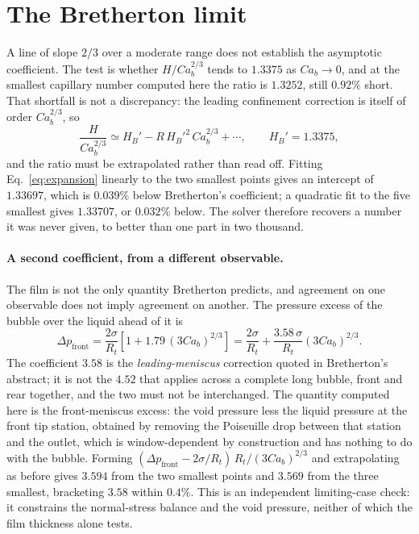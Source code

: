 \documentclass[11pt,a4paper]{article}
\begin{document}
\section{The Bretherton limit}
\label{sec:limit}

A line of slope $2/3$ over a moderate range does not establish the asymptotic
coefficient. The test is whether $H/Ca_b^{2/3}$ tends to $1.3375$ as
$Ca_b\to0$, and at the smallest capillary number computed here the ratio is
$1.3252$, still $0.92\%$ short. That shortfall is not a discrepancy: the
leading confinement correction is itself of order $Ca_b^{2/3}$, so
\begin{equation}
  \frac{H}{Ca_b^{2/3}}\simeq H_B'-R\,H_B'^2\,Ca_b^{2/3}+\cdots,
  \qquad H_B'=1.3375,
  \label{eq:expansion}
\end{equation}
and the ratio must be extrapolated rather than read off. Fitting
Eq.~\eqref{eq:expansion} linearly to the two smallest points gives an intercept
of $1.33697$, which is $0.039\%$ below Bretherton's coefficient; a quadratic fit
to the five smallest gives $1.33707$, or $0.032\%$ below. The solver therefore
recovers a number it was never given, to better than one part in two thousand.

\paragraph{A second coefficient, from a different observable.} The film is not
the only quantity Bretherton predicts, and agreement on one observable does not
imply agreement on another. The pressure excess of the bubble over the liquid
ahead of it is
\begin{equation}
  \Delta p_{\mathrm{front}}
  =\frac{2\sigma}{R_t}\left[1+1.79\,(3Ca_b)^{2/3}\right]
  =\frac{2\sigma}{R_t}+\frac{3.58\,\sigma}{R_t}(3Ca_b)^{2/3}.
  \label{eq:pressure}
\end{equation}
The coefficient $3.58$ is the \emph{leading-meniscus} correction quoted in
Bretherton's abstract; it is not the $4.52$ that applies across a complete long
bubble, front and rear together, and the two must not be interchanged. The
quantity computed here is the front-meniscus excess: the void pressure less the
liquid pressure at the front tip station, obtained by removing the Poiseuille
drop between that station and the outlet, which is window-dependent by
construction and has nothing to do with the bubble. Forming
$(\Delta p_{\mathrm{front}}-2\sigma/R_t)\,R_t/(3Ca_b)^{2/3}$ and extrapolating
as before gives $3.594$ from the two smallest points and $3.569$ from the three
smallest, bracketing $3.58$ within $0.4\%$. This is an independent limiting-case
check: it constrains the normal-stress balance and the void pressure, neither of
which the film thickness alone tests.
\end{document}

